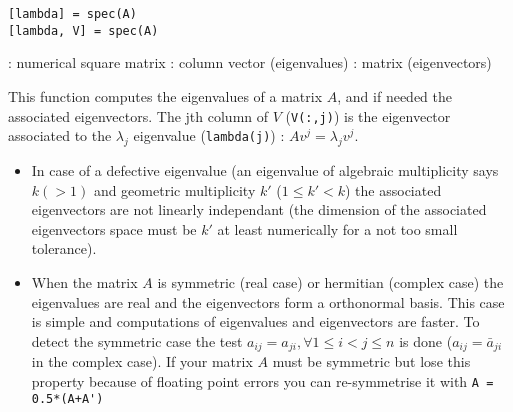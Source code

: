 
\begin{mandesc}
\end{mandesc}

\begin{calling_sequence}
\begin{verbatim}
[lambda] = spec(A)
[lambda, V] = spec(A)
\end{verbatim}
\end{calling_sequence}
\begin{parameters}
  \begin{varlist}
     :  numerical square matrix
     : column vector (eigenvalues)
     : matrix (eigenvectors)
  \end{varlist}
\end{parameters}

\begin{mandescription}
This function computes the eigenvalues of a matrix $A$, and if
needed the associated eigenvectors. The jth column of $V$ 
(\verb+V(:,j)+) is the eigenvector associated to the 
$\lambda_j$ eigenvalue (\verb+lambda(j)+) : $A v^j = \lambda_j v^j$.

\begin{itemize}
\item In case of a defective eigenvalue (an eigenvalue of
      algebraic multiplicity says $k (>1)$ and geometric multiplicity
      $k'$ ($1 \le k' < k$) the associated eigenvectors are not
      linearly independant (the dimension of the associated 
      eigenvectors space must be $k'$ at least numerically for
      a not too small tolerance).
\item When the matrix $A$ is symmetric (real case) or hermitian
      (complex case) the eigenvalues are real and the eigenvectors 
      form a orthonormal basis. This case is simple and computations
      of eigenvalues and eigenvectors are faster. To detect the
      symmetric case the test  $a_{ij} = a_{ji}, \forall 1\le i < j
      \le n$ is done ($a_{ij} = \bar{a}_{ji}$ in the complex case).
      If your matrix $A$ must be symmetric but lose this property because
      of floating point errors you can re-symmetrise it with 
      \verb-A = 0.5*(A+A')-
\end{itemize}

\end{mandescription}

